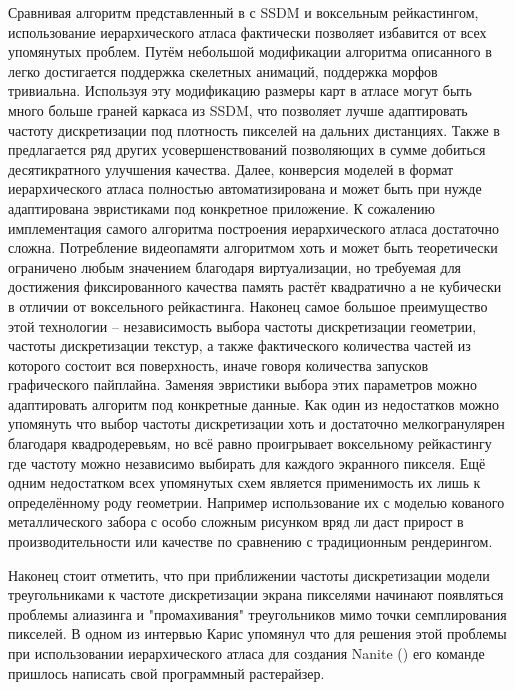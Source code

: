\documentclass{article}
\begin{document}
Сравнивая алгоритм представленный в \cite{niski2007multi} с SSDM и воксельным рейкастингом, использование иерархического атласа фактически позволяет избавится от всех упомянутых проблем. Путём небольшой модификации алгоритма описанного в \cite{feng2010feature} легко достигается поддержка скелетных анимаций, поддержка морфов тривиальна. Используя эту модификацию размеры карт в атласе могут быть много больше граней каркаса из SSDM, что позволяет лучше адаптировать частоту дискретизации под плотность пикселей на дальних дистанциях. Также в \cite{feng2010feature} предлагается ряд других усовершенствований \cite{niski2007multi} позволяющих в сумме добиться десятикратного улучшения качества. Далее, конверсия моделей в формат иерархического атласа полностью автоматизирована и может быть при нужде адаптирована эвристиками под конкретное приложение. К сожалению имплементация самого алгоритма построения иерархического атласа достаточно сложна. Потребление видеопамяти алгоритмом хоть и может быть теоретически ограничено любым значением благодаря виртуализации, но требуемая для достижения фиксированного качества память растёт квадратично а не кубически в отличии от воксельного рейкастинга. Наконец самое большое преимущество этой технологии -- независимость выбора частоты дискретизации геометрии, частоты дискретизации текстур, а также фактического количества частей из которого состоит вся поверхность, иначе говоря количества запусков графического пайплайна. Заменяя эвристики выбора этих параметров можно адаптировать алгоритм под конкретные данные. Как один из недостатков можно упомянуть что выбор частоты дискретизации хоть и достаточно мелкогранулярен благодаря квадродеревьям, но всё равно проигрывает воксельному рейкастингу где частоту можно независимо выбирать для каждого экранного пикселя. Ещё одним недостатком всех упомянутых схем является применимость их лишь к определённому роду геометрии. Например использование их с моделью кованого металлического забора с особо сложным рисунком вряд ли даст прирост в производительности или качестве по сравнению с традиционным рендерингом.

Наконец стоит отметить, что при приближении частоты дискретизации модели треугольниками к частоте дискретизации экрана пикселями начинают появляться проблемы алиазинга и "промахивания" треугольников мимо точки семплирования пикселей. В одном из интервью Карис упомянул что для решения этой проблемы при использовании иерархического атласа для создания Nanite (\cite{nanite}) его команде пришлось написать свой программный растерайзер.
\end{document}
